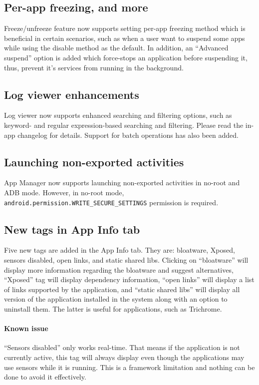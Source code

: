 \subsection{Per-app freezing, and more}
Freeze/unfreeze feature now supports setting per-app freezing method which is beneficial in certain
scenarios, such as when a user want to suspend some apps while using the disable method as the
default. In addition, an ``Advanced suspend'' option is added which force-stops an application
before suspending it, thus, prevent it's services from running in the background.

\subsection{Log viewer enhancements}
Log viewer now supports enhanced searching and filtering options, such as keyword- and regular
expression-based searching and filtering. Please read the in-app changelog for details. Support for
batch operations has also been added.

\subsection{Launching non-exported activities}
App Manager now supports launching non-exported activities in no-root and ADB mode. However, in
no-root mode, \texttt{android.permission.WRITE\_SECURE\_SETTINGS} permission is required.

\subsection{New tags in App Info tab}
Five new tags are added in the App Info tab. They are: bloatware, Xposed, sensors disabled, open
links, and static shared libs. Clicking on ``bloatware'' will display more information regarding
the bloatware and suggest alternatives, ``Xposed'' tag will display dependency information, ``open
links'' will display a list of links supported by the application, and ``static shared libs'' will
display all version of the application installed in the system along with an option to uninstall
them. The latter is useful for applications, such as Trichrome.

\paragraph{Known issue} ``Sensors disabled'' only works real-time. That means if the application is
not currently active, this tag will always display even though the applications may use sensors
while it is running. This is a framework limitation and nothing can be done to avoid it effectively.

